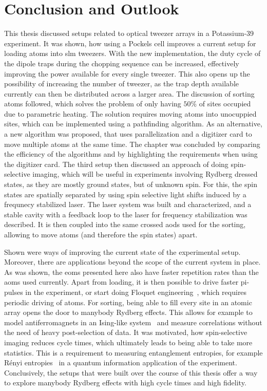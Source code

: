 \chapter{Conclusion and Outlook}

This thesis discussed setups related to optical tweezer arrays in a Potassium-39 experiment. It was shown, how using a Pockels cell improves a current setup for loading atoms into \ac{slm} tweezers. With the new implementation, the duty cycle of the dipole traps during the chopping sequence can be increased, effectively improving the power available for every single tweezer. This also opens up the possibility of increasing the number of tweezer, as the trap depth available currently can then be distributed across a larger area. The discussion of sorting atoms followed, which solves the problem of only having $50\%$ of sites occupied due to parametric heating. The solution requires moving atoms into unocuppied sites, which can be implemented using a pathfinding algorithm. As an alternative, a new algorithm was proposed, that uses parallelization and a digitizer card to move multiple atoms at the same time. The chapter was concluded by comparing the efficiency of the algorithms and by highlighting the requirements when using the digitizer card. The third setup then discussed an approach of doing spin-selective imaging, which will be useful in experiments involving Rydberg dressed states, as they are mostly ground states, but of unknown spin. For this, the spin states are spatially separated by using spin selective light shifts induced by a frequnecy stabilized laser. The laser system was built and characterized, and a stable cavity with a feedback loop to the laser for frequency stabilization was described. It is then coupled into the same crossed \acp{aod} used for the sorting, allowing to move atoms (and therefore the spin states) apart.

Shown were ways of improving the current state of the experimental setup. Moreover, there are applications beyond the scope of the current system in place. As was shown, the \acp{eom} presented here also have faster repetition rates than the \acp{aom} used currently. Apart from loading, it is then possible to drive faster pi-pulses in the experiment, or start doing Floquet engineering~\cite{Oka2019}, which requires periodic driving of atoms. For sorting, being able to fill every site in an atomic array opens the door to manybody Rydberg effects. This allows for example to model antiferromagnets in an Ising-like system~\cite{Lienhard2018} and measure correlations without the need of heavy post-selection of data. It was motivated, how spin-selective imaging reduces cycle times, which ultimately leads to being able to take more statistics. This is a requirement to measuring entanglement entropies, for example Rényi entropies~\cite{Wilde2014} in a quantum information application of the experiment. Conclusively, the setups that were built over the course of this thesis offer a way to explore manybody Rydberg effects with high cycle times and high fidelity.
